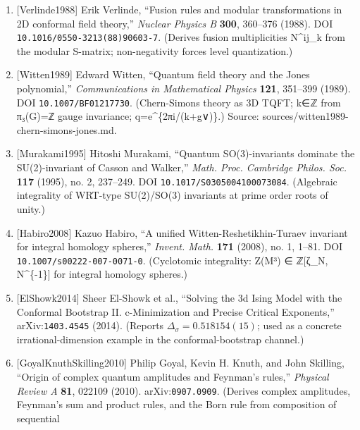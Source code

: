 \documentclass[
]{article}
\begin{document}
\begin{enumerate}
  ``Invariants of 3-manifolds via link polynomials and quantum groups,''
  \emph{Inventiones Mathematicae} \textbf{103}, 547--598 (1991). DOI
  \texttt{10.1007/BF01239527}. (RT construction: ribbon categories +
  quantum groups → 3-manifold invariants; forces q\_QG =
  e\^{}\{2πi/(k+g∨)\} from unitarity of the modular tensor category.)
\item
  {[}Verlinde1988{]} Erik Verlinde, ``Fusion rules and modular
  transformations in 2D conformal field theory,'' \emph{Nuclear Physics
  B} \textbf{300}, 360--376 (1988). DOI
  \texttt{10.1016/0550-3213(88)90603-7}. (Derives fusion multiplicities
  N\^{}ij\_k from the modular S-matrix; non-negativity forces level
  quantization.)
\item
  {[}Witten1989{]} Edward Witten, ``Quantum field theory and the Jones
  polynomial,'' \emph{Communications in Mathematical Physics}
  \textbf{121}, 351--399 (1989). DOI \texttt{10.1007/BF01217730}.
  (Chern-Simons theory as 3D TQFT; k∈ℤ from π₃(G)=ℤ gauge invariance;
  q=e\^{}\{2πi/(k+g∨)\}.) Source:
  sources/witten1989-chern-simons-jones.md.
\item
  {[}Murakami1995{]} Hitoshi Murakami, ``Quantum SO(3)-invariants
  dominate the SU(2)-invariant of Casson and Walker,'' \emph{Math. Proc.
  Cambridge Philos. Soc.} \textbf{117} (1995), no. 2, 237--249. DOI
  \texttt{10.1017/S0305004100073084}. (Algebraic integrality of WRT-type
  SU(2)/SO(3) invariants at prime order roots of unity.)
\item
  {[}Habiro2008{]} Kazuo Habiro, ``A unified Witten-Reshetikhin-Turaev
  invariant for integral homology spheres,'' \emph{Invent. Math.}
  \textbf{171} (2008), no. 1, 1--81. DOI
  \texttt{10.1007/s00222-007-0071-0}. (Cyclotomic integrality: Z(M³) ∈
  ℤ{[}ζ\_N, N\^{}\{-1\}{]} for integral homology spheres.)
\item
  {[}ElShowk2014{]} Sheer El-Showk et al., ``Solving the 3d Ising Model
  with the Conformal Bootstrap II. c-Minimization and Precise Critical
  Exponents,'' arXiv:\texttt{1403.4545} (2014). (Reports
  \(\Delta_\sigma = 0.518154(15)\); used as a concrete
  irrational-dimension example in the conformal-bootstrap channel.)
\item
  {[}GoyalKnuthSkilling2010{]} Philip Goyal, Kevin H. Knuth, and John
  Skilling, ``Origin of complex quantum amplitudes and Feynman's
  rules,'' \emph{Physical Review A} \textbf{81}, 022109 (2010).
  arXiv:\texttt{0907.0909}. (Derives complex amplitudes, Feynman's sum
  and product rules, and the Born rule from composition of sequential

\end{enumerate}
\end{document}
